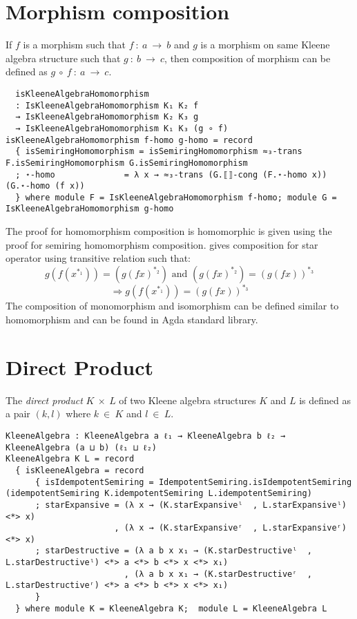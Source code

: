 \section{Morphism composition}
If $f$ is a morphism such that $f\ :\ a \ \rightarrow \ b$ and $g$ is a morphism
on same Kleene algebra structure such that $g\ :\ b\ \rightarrow \ c$, then
composition of morphism can be defined as $g \ ∘\ f\ :\ a \ \rightarrow \ c$.
\begin{verbatim}
  isKleeneAlgebraHomomorphism
  : IsKleeneAlgebraHomomorphism K₁ K₂ f
  → IsKleeneAlgebraHomomorphism K₂ K₃ g
  → IsKleeneAlgebraHomomorphism K₁ K₃ (g ∘ f)
isKleeneAlgebraHomomorphism f-homo g-homo = record
  { isSemiringHomomorphism = isSemiringHomomorphism ≈₃-trans F.isSemiringHomomorphism G.isSemiringHomomorphism
  ; ⋆-homo              = λ x → ≈₃-trans (G.⟦⟧-cong (F.⋆-homo x)) (G.⋆-homo (f x))
  } where module F = IsKleeneAlgebraHomomorphism f-homo; module G = IsKleeneAlgebraHomomorphism g-homo
\end{verbatim}
The proof for homomorphism composition is homomorphic is given using the proof
for semiring homomorphism composition.  gives composition for
star operator using transitive relation such that: 
\[g (f (x^{*_1})) = (g (f x) ^{*_2}) \text{ and } (g (f x) ^{*_2}) = (g (f x))^{*_3}\] 
\[\Rightarrow g (f (x^{*_1})) = (g (f x))^{*_3}\]
 The composition of
monomorphism and isomorphism can be defined similar to homomorphism and can be
found in Agda standard library.

\section{Direct Product}
The \textit{direct product} $K \ \times \ L$ of two Kleene algebra structures
$K$ and $L$ is defined as a pair $(k,l)$ where $k \ \in \ K$ and $l \ \in \ L$.
\begin{verbatim}
KleeneAlgebra : KleeneAlgebra a ℓ₁ → KleeneAlgebra b ℓ₂ → KleeneAlgebra (a ⊔ b) (ℓ₁ ⊔ ℓ₂)
KleeneAlgebra K L = record
  { isKleeneAlgebra = record
      { isIdempotentSemiring = IdempotentSemiring.isIdempotentSemiring (idempotentSemiring K.idempotentSemiring L.idempotentSemiring)
      ; starExpansive = (λ x → (K.starExpansiveˡ  , L.starExpansiveˡ) <*> x)
                      , (λ x → (K.starExpansiveʳ  , L.starExpansiveʳ) <*> x)
      ; starDestructive = (λ a b x x₁ → (K.starDestructiveˡ  , L.starDestructiveˡ) <*> a <*> b <*> x <*> x₁)
                        , (λ a b x x₁ → (K.starDestructiveʳ  , L.starDestructiveʳ) <*> a <*> b <*> x <*> x₁)
      }
  } where module K = KleeneAlgebra K;  module L = KleeneAlgebra L
\end{verbatim}

